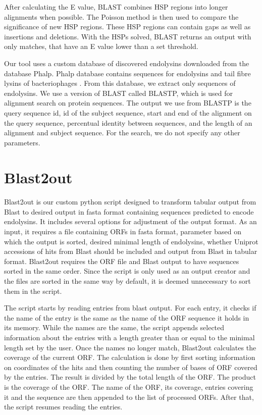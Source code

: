 After calculating the E value, BLAST combines HSP regions into longer alignments when possible. The Poisson method is then used to compare the significance of new HSP regions. These HSP regions can contain gaps as well as insertions and deletions. With the HSPs solved, BLAST returns an output with only matches, that have an E value lower than a set threshold.

Our tool uses a custom database of discovered endolysins downloaded from the database Phalp. Phalp database contains sequences for endolysins and tail fibre lysins of bacteriophages \cite{criel2021phalp}. From this database, we extract only sequences of endolysins. We use a version of BLAST called BLASTP, which is used for alignment search on protein sequences. The output we use from BLASTP is the query sequence id, id of the subject sequence, start and end of the alignment on the query sequence, percentual identity between sequences, and the length of an alignment and subject sequence. For the search, we do not specify any other parameters.

\section{Blast2out}
\paragraph*{}
Blast2out is our custom python script designed to transform tabular output from Blast to desired output in fasta format containing sequences predicted to encode endolysins. It includes several options for adjustment of the output format. As an input, it requires a file containing ORFs in fasta format, parameter based on which the output is sorted, desired minimal length of endolysins, whether Uniprot accessions of hits from Blast should be included and output from Blast in tabular format. Blast2out requires the ORF file and Blast output to have sequences sorted in the same order. Since the script is only used as an output creator and the files are sorted in the same way by default, it is deemed unnecessary to sort them in the script. 

The script starts by reading entries from blast output. For each entry, it checks if the name of the entry is the same as the name of the ORF sequence it holds in its memory. While the names are the same, the script appends selected information about the entries with a length greater than or equal to the minimal length set by the user. Once the names no longer match, Blast2out calculates the coverage of the current ORF. The calculation is done by first sorting information on coordinates of the hits and then counting the number of bases of ORF covered by the entries. The result is divided by the total length of the ORF. The product is the coverage of the ORF. The name of the ORF, its coverage, entries covering it and the sequence are then appended to the list of processed ORFs. After that, the script resumes reading the entries.

